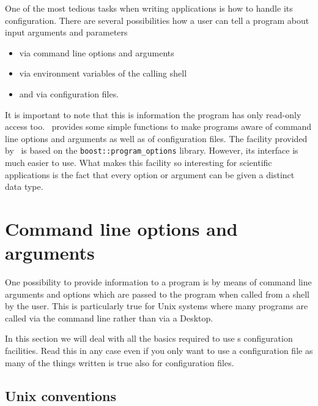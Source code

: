
One of the most tedious tasks when writing applications is how to handle its
configuration. There are several possibilities how a user can tell a program
about input arguments and parameters 
\begin{itemize}
\item via command line options and arguments
\item via environment variables of the calling shell
\item and via configuration files.
\end{itemize}
It is important to note that this is information the program has only read-only
access too. \libpnicore\ provides some simple functions to make programs aware
of command line options and arguments as well as of configuration files. The
facility provided by \libpnicore\ is based on the {\tt boost::program\_options}
library. However, its interface is much easier to use.  
What makes this facility so interesting for scientific applications is the fact
that every option or argument can be given a distinct data type. 

\section{Command line options and arguments}

One possibility to provide information to a program is by means of command line
arguments and options which are passed to the program when called from a shell
by the user. This is particularly true for Unix systems where many programs are
called via the command line rather than via a Desktop. 

In this section we will deal with all the basics required to use \libpnicore s
configuration facilities. Read this in any case even if you only want to use a
configuration file as many of the things written is true also for configuration
files. 

\subsection{Unix conventions}


